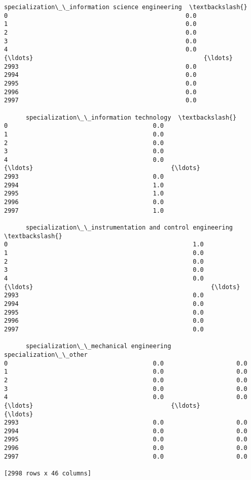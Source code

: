 \documentclass[11pt]{article}
\begin{document}
\begin{tcolorbox}[breakable, size=fbox, boxrule=.5pt, pad at break*=1mm, opacityfill=0]
\begin{Verbatim}[commandchars=\\\{\}]
      specialization\_\_information science engineering  \textbackslash{}
0                                                 0.0
1                                                 0.0
2                                                 0.0
3                                                 0.0
4                                                 0.0
{\ldots}                                               {\ldots}
2993                                              0.0
2994                                              0.0
2995                                              0.0
2996                                              0.0
2997                                              0.0

      specialization\_\_information technology  \textbackslash{}
0                                        0.0
1                                        0.0
2                                        0.0
3                                        0.0
4                                        0.0
{\ldots}                                      {\ldots}
2993                                     0.0
2994                                     1.0
2995                                     1.0
2996                                     0.0
2997                                     1.0

      specialization\_\_instrumentation and control engineering  \textbackslash{}
0                                                   1.0
1                                                   0.0
2                                                   0.0
3                                                   0.0
4                                                   0.0
{\ldots}                                                 {\ldots}
2993                                                0.0
2994                                                0.0
2995                                                0.0
2996                                                0.0
2997                                                0.0

      specialization\_\_mechanical engineering  specialization\_\_other
0                                        0.0                    0.0
1                                        0.0                    0.0
2                                        0.0                    0.0
3                                        0.0                    0.0
4                                        0.0                    0.0
{\ldots}                                      {\ldots}                    {\ldots}
2993                                     0.0                    0.0
2994                                     0.0                    0.0
2995                                     0.0                    0.0
2996                                     0.0                    0.0
2997                                     0.0                    0.0

[2998 rows x 46 columns]
\end{Verbatim}
\end{tcolorbox}
        
\end{document}
